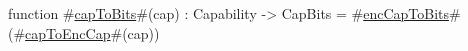 function #\hyperref[sailRISCVzcapToBits]{capToBits}#(cap) : Capability -> CapBits = #\hyperref[sailRISCVzencCapToBits]{encCapToBits}#(#\hyperref[sailRISCVzcapToEncCap]{capToEncCap}#(cap))
